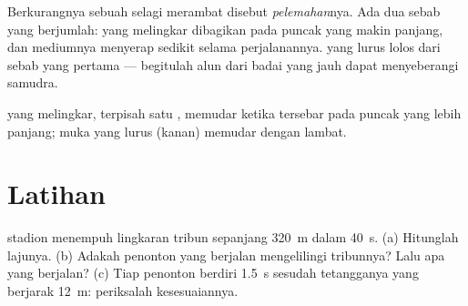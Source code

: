 \begin{definition}[Pelemahan]\label{def:g12:mechanical-waves:attenuation}
Berkurangnya  sebuah  selagi merambat disebut
\emph{pelemahan}nya. Ada dua sebab yang berjumlah:
  yang melingkar dibagikan pada puncak yang makin
panjang, dan mediumnya menyerap sedikit selama perjalanannya.  yang lurus lolos dari sebab yang pertama --- begitulah alun
dari badai yang jauh dapat menyeberangi samudra.
\end{definition}

\begin{omfigure}

{\small {} yang melingkar, terpisah satu ,
memudar ketika  tersebar pada puncak yang lebih panjang; muka
yang lurus (kanan) memudar dengan lambat.}
\end{omfigure}

\section{Latihan}

\begin{exercise}[$\star$]\label{exo:g12:mechanical-waves:1}
 stadion menempuh lingkaran tribun sepanjang \qty{320}{m}
dalam \qty{40}{s}. (a) Hitunglah lajunya. (b) Adakah penonton yang
berjalan mengelilingi tribunnya? Lalu apa yang berjalan? (c) Tiap
penonton berdiri \qty{1.5}{s} sesudah tetangganya yang berjarak
\qty{12}{m}: periksalah kesesuaiannya.
\end{exercise}

